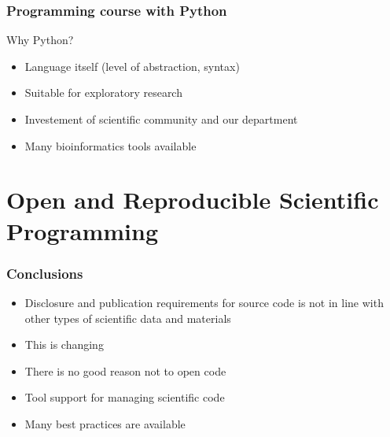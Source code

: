 \documentclass[slidestop]{beamer}
\begin{document}
{
  \frame{}
}

\begin{frame}
  \frametitle{Programming course with Python}
  Why Python?
  \begin{itemize}
    \item Language itself (level of abstraction, syntax)
    \item Suitable for exploratory research
    \item Investement of scientific community and our department
    \item Many bioinformatics tools available
  \end{itemize}
\end{frame}

\section*{Open and Reproducible Scientific Programming}

\begin{frame}
  \frametitle{Conclusions}
  \begin{itemize}
    \item Disclosure and publication requirements for source code is not in
      line with other types of scientific data and materials
    \item This is changing
    \item There is no good reason not to open code
    \item Tool support for managing scientific code
    \item Many best practices are available
  \end{itemize}
\end{frame}
\end{document}
